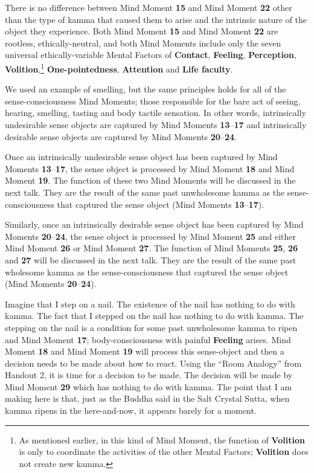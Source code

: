 There is no difference between Mind Moment \textbf{15} and Mind Moment \textbf{22} other than the type of kamma that caused them to arise and the intrinsic nature of the object they experience. Both Mind Moment \textbf{15} and Mind Moment \textbf{22} are rootless, ethically-neutral, and both Mind Moments include only the seven universal ethically-variable Mental Factors of \textbf{Contact}, \textbf{Feeling}, \textbf{Perception}, \textbf{Volition},\footnote{As mentioned earlier, in this kind of Mind Moment, the function of \textbf{Volition} is only to coordinate the activities of the other Mental Factors; \textbf{Volition} does not create new kamma.} \textbf{One-pointedness}, \textbf{Attention} and \textbf{Life faculty}.

We used an example of smelling, but the same principles holds for all of the sense-consciousness Mind Moments; those responsible for the bare act of seeing, hearing, smelling, tasting and body tactile sensation. In other words, intrinsically undesirable sense objects are captured by Mind Moments \textbf{13}--\textbf{17} and intrinsically desirable sense objects are captured by Mind Moments \textbf{20}--\textbf{24}.

Once an intrinsically undesirable sense object has been captured by Mind Moments \textbf{13}--\textbf{17}, the sense object is processed by Mind Moment \textbf{18} and Mind Moment \textbf{19}. The function of these two Mind Moments will be discussed in the next talk. They are the result of the same past unwholesome kamma as the sense-consciousness that captured the sense object (Mind Moments \textbf{13}--\textbf{17}).

Similarly, once an intrinsically desirable sense object has been captured by Mind Moments \textbf{20}--\textbf{24}, the sense object is processed by Mind Moment \textbf{25} and either Mind Moment \textbf{26} or Mind Moment \textbf{27}. The function of Mind Moments \textbf{25}, \textbf{26} and \textbf{27} will be discussed in the next talk. They are the result of the same past wholesome kamma as the sense-consciousness that captured the sense object (Mind Moments \textbf{20}--\textbf{24}).

Imagine that I step on a nail. The existence of the nail has nothing to do with kamma. The fact that I stepped on the nail has nothing to do with kamma. The stepping on the nail is a condition for some past unwholesome kamma to ripen and Mind Moment \textbf{17}; body-consciousness with painful \textbf{Feeling} arises. Mind Moment \textbf{18} and Mind Moment \textbf{19} will process this sense-object and then a decision needs to be made about how to react. Using the “Room Analogy” from Handout 2, it is time for a decision to be made. The decision will be made by Mind Moment \textbf{29} which has nothing to do with kamma. The point that I am making here is that, just as the Buddha said in the Salt Crystal Sutta, when kamma ripens in the here-and-now, it appears barely for a moment.

